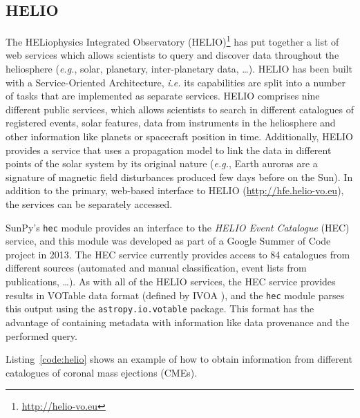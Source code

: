 \subsection{HELIO}\label{ssec:helio}

The HELiophysics Integrated Observatory 
(HELIO)\footnote{\url{http://helio-vo.eu}} has put together a list of web 
services which allows scientists to query and discover data throughout 
the heliosphere (\textit{e.g.}, solar, planetary, inter-planetary data, 
\ldots)\citep{dps2012}.
HELIO has been built with a Service-Oriented Architecture, 
\textit{i.e.} its capabilities are split into a number of tasks that are 
implemented as separate services. 
HELIO comprises nine different public services, which allows scientists
to search in different catalogues of registered events, solar features,
data from instruments in the heliosphere and other information like planets or 
spacecraft position in time. 
Additionally, HELIO provides a service that uses a propagation model to link 
the data in different points of the solar system by its original nature 
(\textit{e.g.}, Earth auroras are a signature of magnetic field disturbances 
produced few days before on the Sun).
In addition to the primary, web-based interface to HELIO
(\url{http://hfe.helio-vo.eu}), the services can be separately accessed.

SunPy's \texttt{hec} module provides an interface to the
\textit{HELIO Event Catalogue} (HEC) service, and this module was developed as
part of a Google Summer of Code project in 2013.
The HEC service currently provides access to 84 catalogues from different
sources (automated and manual classification, event lists from publications, \ldots).
As with all of the HELIO services, the HEC service provides results in VOTable 
data format (defined by IVOA \cite{ochsenbein_ivoa_2011}), and the \texttt{hec}
module parses this output using the \texttt{astropy.io.votable} package.
This format has the advantage of containing metadata with information like
data provenance and the performed query.

Listing~\ref{code:helio} shows an example of how to obtain information
from different catalogues of coronal mass ejections (CMEs).

